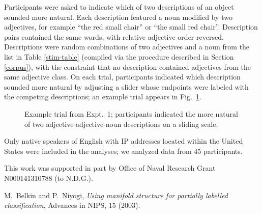 \documentclass{pnastwo}
\begin{document}
\begin{article}
\begin{materials}
Participants were asked to indicate which of two descriptions of an object sounded more natural. Each description featured a noun modified by two adjectives, for example ``the red small chair'' or ``the small red chair''. Description pairs contained the same words, with relative adjective order reversed. Descriptions were random combinations of two adjectives and a noun from the list in Table \ref{stim-table} (compiled via the procedure described in Section \ref{corpus}), with the constraint that no description contained adjectives from the same adjective class.
On each trial, participants indicated which description sounded more natural by adjusting a slider whose endpoints were labeled with the competing descriptions; an example trial appears in Fig.\ \ref{order-trial}.

\begin{figure}[h!]
	\centering
	\caption{Example trial from Expt.\ 1; participants indicated the more natural of two adjective-adjective-noun descriptions on a sliding scale.}\label{order-trial}
\end{figure}

Only native speakers of English with IP addresses located within the United States were included in the analyses; we analyzed data from 45 participants.


\end{materials}

\begin{acknowledgments}
This work was supported in part by Office of Naval Research Grant N000141310788 (to N.D.G.).
\end{acknowledgments}

\begin{thebibliography}{10}
M.~Belkin and P.~Niyogi, {\em Using manifold structure for partially
  labelled classification}, Advances in NIPS, 15 (2003).


\end{thebibliography}
\end{article}
\end{document}
